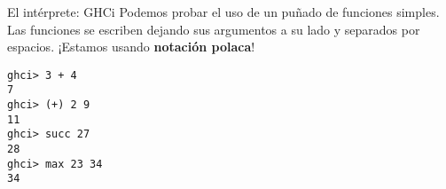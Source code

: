 \begin{frame}[fragile]{El intérprete: GHCi}
  Podemos probar el uso de un puñado de funciones simples. Las funciones
  se escriben dejando sus argumentos a su lado y separados por espacios. ¡Estamos usando
  \textbf{notación polaca}!

  \begin{lstlisting}
ghci> 3 + 4
7
ghci> (+) 2 9
11
ghci> succ 27
28
ghci> max 23 34
34
  \end{lstlisting}
\end{frame}
